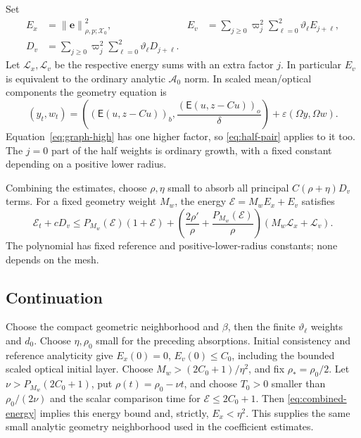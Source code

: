 \documentclass[11pt,a4paper]{article}
\numberwithin{equation}{section}
\theoremstyle{remark}
\newcommand{\norm}[1]{\left\lVert #1\right\rVert}
\newcommand{\Graph}{\mathsf E}
\newcommand{\Xzero}{\mathcal X_0}
\newcommand{\Azero}{\mathcal A_0}
\begin{document}
Set
\[
 \begin{aligned}
 E_x&=\norm{\mathbf e}_{\rho,p;\Xzero}^2,&
 E_v&=\sum_{j\geq0}\varpi_j^2\sum_{\ell=0}^2\vartheta_\ell E_{j+\ell},\\
 D_v&=\sum_{j\geq0}\varpi_j^2\sum_{\ell=0}^2\vartheta_\ell D_{j+\ell}.
 \end{aligned}
\]
Let \(\mathcal L_x,\mathcal L_v\) be the respective energy sums
with an extra factor \(j\). In particular \(E_v\) is equivalent
to the ordinary analytic \(\Azero\) norm. In scaled mean/optical
components the geometry equation is
\[
 (y_t,w_t)=
 \left((\Graph(u,z-Cu))_b,\frac{(\Graph(u,z-Cu))_o}{\delta}\right)
                         +\varepsilon(\Omega y,\Omega w).
\]
Equation~\eqref{eq:graph-high}
has one higher factor, so \eqref{eq:half-pair} applies to it too.
The \(j=0\) part of the half weights is ordinary growth, with a
fixed constant depending on a positive lower radius.

Combining the estimates, choose \(\rho,\eta\) small to absorb
all principal \(C(\rho+\eta)D_v\) terms. For a fixed geometry
weight \(M_w\), the energy \(\mathcal E=M_wE_x+E_v\) satisfies
\begin{equation}\label{eq:combined-energy}
 \mathcal E_t+cD_v
 \leq P_{M_w}(\mathcal E)(1+\mathcal E)
  +\left(\frac{2\rho'}{\rho}
       +\frac{P_{M_w}(\mathcal E)}{\rho}\right)
                          (M_w\mathcal L_x+\mathcal L_v).
\end{equation}
The polynomial has fixed reference and positive-lower-radius
constants; none depends on the mesh.

\subsection{Continuation}

Choose the compact geometric neighborhood and \(\beta\), then the
finite \(\vartheta_\ell\) weights and \(d_0\). Choose \(\eta,\rho_0\)
small for the preceding absorptions. Initial consistency and
reference analyticity give \(E_x(0)=0\), \(E_v(0)\leq C_0\),
including the bounded scaled optical initial layer.
Choose \(M_w>(2C_0+1)/\eta^2\), and fix
\(\rho_*=\rho_0/2\).
Let \(\nu>P_{M_w}(2C_0+1)\), put \(\rho(t)=\rho_0-\nu t\),
and choose \(T_0>0\) smaller than \(\rho_0/(2\nu)\) and the
scalar comparison time for \(\mathcal E\leq2C_0+1\).
Then \eqref{eq:combined-energy} implies this energy bound and,
strictly, \(E_x<\eta^2\). This supplies the same small analytic
geometry neighborhood used in the coefficient estimates.
\end{document}
